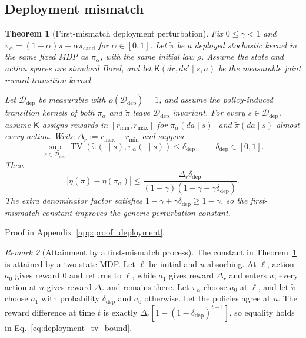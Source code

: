 \documentclass{article}
\theoremstyle{plain}
\newtheorem{theorem}{Theorem}[section]
\theoremstyle{definition}
\theoremstyle{remark}
\newtheorem{remark}[theorem]{Remark}
\begin{document}
\subsection{Deployment mismatch}
\label{app:deployment_mismatch}

\begin{theorem}[First-mismatch deployment perturbation]
\label{thm:deployment_perturbation}
Fix $0\le\gamma<1$ and
$\pi_\alpha=(1-\alpha)\pi+\alpha\pi_{\mathrm{cand}}$ for
$\alpha\in[0,1]$. Let $\widetilde\pi$ be a deployed stochastic kernel in the
same fixed MDP as $\pi_\alpha$, with the same initial law $\rho$. Assume the
state and action spaces are standard Borel, and let
$\mathsf K(dr,ds'\mid s,a)$ be the measurable joint reward-transition
kernel.

Let $\mathcal D_{\mathrm{dep}}$ be measurable with
$\rho(\mathcal D_{\mathrm{dep}})=1$, and assume the policy-induced transition
kernels of both $\pi_\alpha$ and $\widetilde\pi$ leave
$\mathcal D_{\mathrm{dep}}$ invariant. For every
$s\in\mathcal D_{\mathrm{dep}}$, assume $\mathsf K$ assigns rewards in
$[r_{\min},r_{\max}]$ for $\pi_\alpha(da\mid s)$- and
$\widetilde\pi(da\mid s)$-almost every action. Write
$\Delta_r:=r_{\max}-r_{\min}$ and suppose
\begin{equation}
\sup_{s\in\mathcal D_{\mathrm{dep}}}
\operatorname{TV}\!\left(
\widetilde\pi(\cdot\mid s),\pi_\alpha(\cdot\mid s)\right)
\le\delta_{\mathrm{dep}},
\qquad \delta_{\mathrm{dep}}\in[0,1].
\label{eq:deployment_uniform_tv}
\end{equation}
Then
\begin{equation}
\left|\eta(\widetilde\pi)-\eta(\pi_\alpha)\right|
\le
\frac{\Delta_r\delta_{\mathrm{dep}}}
{(1-\gamma)(1-\gamma+\gamma\delta_{\mathrm{dep}})}.
\label{eq:deployment_tv_bound}
\end{equation}
The extra denominator factor satisfies
$1-\gamma+\gamma\delta_{\mathrm{dep}}\ge1-\gamma$, so the first-mismatch
constant improves the generic perturbation constant.

\end{theorem}
Proof in Appendix~\ref{app:proof_deployment}.

\begin{remark}[Attainment by a first-mismatch process]
\label{rem:deployment_attainment}
The constant in Theorem~\ref{thm:deployment_perturbation} is attained by a
two-state MDP. Let $\ell$ be initial and $u$ absorbing. At $\ell$, action
$a_0$ gives reward $0$ and returns to $\ell$, while $a_1$ gives reward
$\Delta_r$ and enters $u$; every action at $u$ gives reward $\Delta_r$ and
remains there. Let $\pi_\alpha$ choose $a_0$ at $\ell$, and let
$\widetilde\pi$ choose $a_1$ with probability $\delta_{\mathrm{dep}}$ and
$a_0$ otherwise. Let the policies agree at $u$. The reward difference at
time $t$ is exactly
$\Delta_r[1-(1-\delta_{\mathrm{dep}})^{t+1}]$, so equality holds in
Eq.~\eqref{eq:deployment_tv_bound}.
\end{remark}
\end{document}
